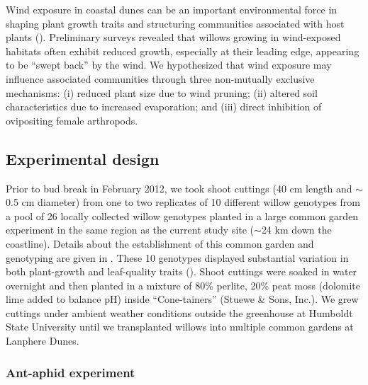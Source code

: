 \documentclass[11pt]{article}
\begin{document}
Wind exposure in coastal dunes can be an important environmental force in shaping plant growth traits and structuring communities associated with host plants (\citealt{Miller_1999, Crutsinger_2010, Crutsinger_2014}).  
Preliminary surveys revealed that willows growing in wind-exposed
habitats often exhibit reduced growth, especially at their leading edge,
appearing to be ``swept back'' by the wind. We hypothesized that wind
exposure may influence associated communities through three non-mutually
exclusive mechanisms: (i) reduced plant size due to wind pruning; (ii)
altered soil characteristics due to increased evaporation; and (iii)
direct inhibition of ovipositing female arthropods.

\subsection*{Experimental design}

Prior to bud break in February 2012, we took shoot cuttings (40 cm
length and $\sim$0.5 cm diameter) from one to two replicates
of 10 different willow genotypes from a pool of 26 locally collected
willow genotypes planted in a large common garden experiment in the same region as the current study site ($\sim$24 km down the coastline). Details
about the establishment of this common garden and genotyping are given in
\cite{Barbour_2015}. These 10 genotypes displayed substantial variation in
both plant-growth and leaf-quality traits (\citealt{Barbour_2015}). Shoot
cuttings were soaked in water overnight and then planted in a mixture of
80\% perlite, 20\% peat moss (dolomite lime added to balance pH) inside
``Cone-tainers'' (Stuewe \& Sons, Inc.). We grew cuttings under ambient
weather conditions outside the greenhouse at Humboldt State University
until we transplanted willows into multiple common gardens at Lanphere
Dunes.

\subsubsection*{Ant-aphid experiment}
\end{document}
